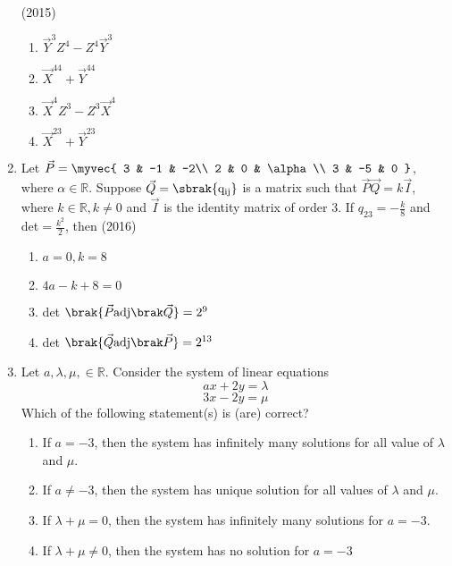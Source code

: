 \begin{enumerate}
        \hfill (2015)
\begin{multicols}{4}
        \begin{enumerate}
            \item $\vec{Y}^3Z^4 -Z^4\vec{Y}^3$
            \item $\vec{X}^{44} + \vec{Y}^{44}$
            \item $\vec{X}^4Z^3 -Z^3\vec{X}^4$
            \item $\vec{X}^{23} + \vec{Y}^{23}$
        \end{enumerate}
\end{multicols}
    \item 
        Let $\vec{P} = 
            \myvec{		
                3 & -1 & -2\\
                2 & 0 & \alpha\\
                3 & -5 & 0
            }$,
        where $\alpha \in \mathbb{R}$. Suppose $\vec{Q}= \mathrm{\sbrak{q_{ij}}}$ is a matrix such that $\vec{P}\vec{Q}=k\vec{I}$, where $k \in \mathbb{R}, k \neq 0$ and $\vec{I}$ is the identity matrix of order $3$. If $q_{23} = -\frac{k}{8}$ and det$= \frac{k^2}{2}$, then
        \hfill (2016)
\begin{multicols}{2}
        \begin{enumerate}
            \item $a=0, k=8$
            \item $4a-k+8=0$
            \item det $\brak{\vec{P} \adj{\vec{Q}}} = 2^9$
            \item det $\brak{\vec{Q} \adj{\vec{P}}} = 2^{13}$
        \end{enumerate}
\end{multicols}
    \item
        Let $a, \lambda, \mu, \in \mathbb{R}$. Consider the system of linear equations $$ax+2y=\lambda$$ $$3x-2y=\mu$$ Which of the following statement(s) is (are) correct?
        \begin{enumerate}
            \item If $a=-3$, then the system has infinitely many solutions for all value of $\lambda$ and $\mu$.
            \item If $a \neq -3$, then the system has unique solution for all values of $\lambda$ and $\mu$.
            \item If $\lambda + \mu = 0$, then the system has infinitely many solutions for $a = -3$.
            \item If $\lambda + \mu \neq 0$, then the system has no solution for $a = -3$

\end{enumerate}
\end{enumerate}
